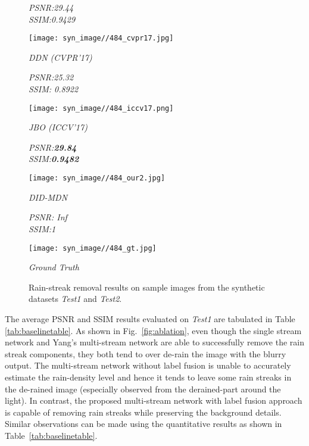 \documentclass[10pt,twocolumn,letterpaper]{article}
\begin{document}
\begin{figure*}[htp!]
\begin{minipage}{.16\textwidth}
		\centering
		\caption*{\emph{PSNR:29.44\\SSIM:0.9429}}
		\vskip-10pt
 		\texttt{[image: syn\_image//484\_cvpr17.jpg]}
		\captionsetup{labelformat=empty}
		\captionsetup{justification=centering}
\caption*{\emph{DDN (CVPR'17) \\\cite{derain_cvpr2017}}}
	\end{minipage} 
	\begin{minipage}{.16\textwidth}
		\centering
		\caption*{\emph{PSNR:25.32\\ SSIM: 0.8922}}
		\vskip-10pt
 		\texttt{[image: syn\_image//484\_iccv17.png]}
		\captionsetup{labelformat=empty}
		\captionsetup{justification=centering}
\caption*{\emph{JBO (ICCV'17) \\ \cite{derain_iccv17}}}
	\end{minipage} 
	\begin{minipage}{.16\textwidth}
		\centering
		\caption*{\emph{PSNR:\textbf{29.84}\\SSIM:\textbf{0.9482}}}
		\vskip-10pt
 		\texttt{[image: syn\_image//484\_our2.jpg]}
		\captionsetup{labelformat=empty}
		\captionsetup{justification=centering}
\caption*{\emph{DID-MDN} \\ \quad}
	\end{minipage}
	\begin{minipage}{.16\textwidth}
		\centering
		\caption*{\emph{PSNR: Inf \\SSIM:1}}
		\vskip-10pt
 		\texttt{[image: syn\_image//484\_gt.jpg]}
		\captionsetup{labelformat=empty}
		\captionsetup{justification=centering}
\caption*{\emph{Ground Truth} \\ \quad}
	\end{minipage}
	\vskip -10pt
	\caption{ Rain-streak removal results on sample images from the synthetic datasets \emph{Test1} and \emph{Test2}.}\label{syn_rainy}
\end{figure*}


The average PSNR and SSIM results evaluated on \emph{Test1} are tabulated in Table \ref{tab:baselinetable}.   As shown in Fig.~\ref{fig:ablation}, even though the single stream network and Yang's multi-stream network \cite{derain_cvpr2017_multi} are able to successfully remove the rain streak components, they both tend to over de-rain the image with the blurry output.  The multi-stream network without label fusion is unable to accurately  estimate the rain-density level and hence it tends to leave some rain streaks in the de-rained image (especially observed from the derained-part around the light).   In contrast, the proposed multi-stream network with label fusion approach is capable of removing rain streaks while preserving the background details. Similar observations can be made using the quantitative results as shown in Table~\ref{tab:baselinetable}.
\end{document}
